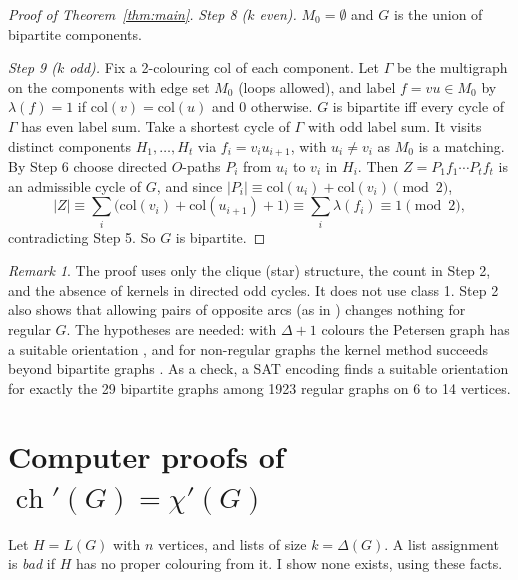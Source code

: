 \documentclass[11pt]{article}
\theoremstyle{plain}
\theoremstyle{definition}
\theoremstyle{remark}
\newtheorem*{remark}{Remark}
\newcommand{\ch}{\operatorname{ch}}
\begin{document}
\begin{proof}[Proof of Theorem~\ref{thm:main}]
\emph{Step 8 ($k$ even).} $M_0 = \emptyset$ and $G$ is the union of bipartite components.

\emph{Step 9 ($k$ odd).} Fix a 2-colouring $\mathrm{col}$ of each component. Let $\Gamma$ be the
multigraph on the components with edge set $M_0$ (loops allowed), and label $f = vu \in M_0$ by
$\lambda(f) = 1$ if $\mathrm{col}(v) = \mathrm{col}(u)$ and $0$ otherwise. $G$ is bipartite iff
every cycle of $\Gamma$ has even label sum. Take a shortest cycle of $\Gamma$ with odd label sum.
It visits distinct components $H_1, \dots, H_t$ via $f_i = v_i u_{i+1}$, with $u_i \ne v_i$ as
$M_0$ is a matching. By Step 6 choose directed $O$-paths $P_i$ from $u_i$ to $v_i$ in $H_i$. Then
$Z = P_1 f_1 \cdots P_t f_t$ is an admissible cycle of $G$, and since
$|P_i| \equiv \mathrm{col}(u_i) + \mathrm{col}(v_i) \pmod 2$,
\[
  |Z| \equiv \sum_i \bigl(\mathrm{col}(v_i) + \mathrm{col}(u_{i+1}) + 1\bigr)
      \equiv \sum_i \lambda(f_i) \equiv 1 \pmod 2,
\]
contradicting Step 5. So $G$ is bipartite.
\end{proof}

\begin{remark}
The proof uses only the clique (star) structure, the count in Step 2, and the absence of kernels
in directed odd cycles. It does not use class 1. Step 2 also shows that allowing pairs of
opposite arcs (as in \cite{mp}) changes nothing for regular $G$. The hypotheses are needed:
with $\Delta + 1$ colours the Petersen graph has a suitable orientation \cite[Thm.~4]{mcd}, and
for non-regular graphs the kernel method succeeds beyond bipartite graphs \cite{mcd,mp}. As a
check, a SAT encoding finds a suitable orientation for exactly the 29 bipartite graphs among
1923 regular graphs on 6 to 14 vertices.
\end{remark}

\section{Computer proofs of $\ch'(G) = \chi'(G)$}

Let $H = L(G)$ with $n$ vertices, and lists of size $k = \Delta(G)$. A list assignment is
\emph{bad} if $H$ has no proper colouring from it. I show none exists, using these facts.
\end{document}
